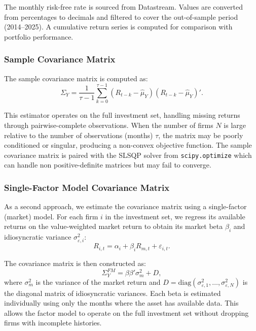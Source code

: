 \documentclass[11pt,a4paper]{article}
\begin{document}
The monthly risk-free rate is sourced from Datastream. Values are converted from percentages to decimals and filtered to cover the out-of-sample period (2014--2025). A cumulative return series is computed for comparison with portfolio performance.

\subsubsection{Sample Covariance Matrix}

The sample covariance matrix is computed as:
\begin{equation}
\Sigma_Y = \frac{1}{\tau-1} \sum_{k=0}^{\tau-1} (R_{t-k} - \hat{\mu}_Y)(R_{t-k} - \hat{\mu}_Y)'.
\end{equation}

This estimator operates on the full investment set, handling missing returns through pairwise-complete observations. When the number of firms \(N\) is large relative to the number of observations (months) \(\tau\), the matrix may be poorly conditioned or singular, producing a non-convex objective function. The sample covariance matrix is paired with the SLSQP solver from \texttt{scipy.optimize} which can handle non positive-definite matrices but may fail to converge.

\subsubsection{Single-Factor Model Covariance Matrix}

As a second approach, we estimate the covariance matrix using a single-factor (market) model. For each firm \(i\) in the investment set, we regress its available returns on the value-weighted market return to obtain its market beta \(\beta_i\) and idiosyncratic variance \(\sigma^2_{\varepsilon,i}\):
\begin{equation}
R_{i,t} = \alpha_i + \beta_i R_{m,t} + \varepsilon_{i,t}.
\end{equation}

The covariance matrix is then constructed as:
\begin{equation}
\Sigma_Y^{FM} = \beta \beta' \sigma^2_m + D,
\end{equation}
where \(\sigma^2_m\) is the variance of the market return and \(D = \text{diag}(\sigma^2_{\varepsilon,1}, \dots, \sigma^2_{\varepsilon,N})\) is the diagonal matrix of idiosyncratic variances. Each beta is estimated individually using only the months where the asset has available data. This allows the factor model to operate on the full investment set without dropping firms with incomplete histories.
\end{document}
